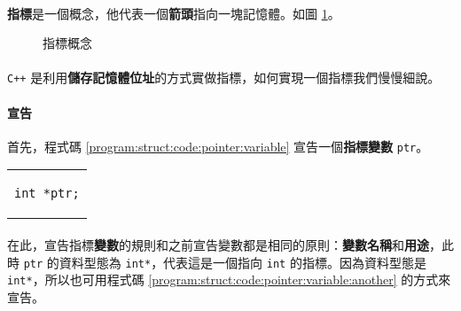 \documentclass[12pt,a4paper,oneside]{article}
\begin{document}
\begin{CJK}{UTF8}{bkai}
\paragraph{}\textbf{指標}是一個概念，他代表一個{\color{blue}\textbf{箭頭}}指向一塊記憶體。如圖 \ref{program:struct:fig:pointer}。

\begin{figure}[h!]
\centering
{}
\caption{指標概念}
\label{program:struct:fig:pointer}
\end{figure}

\paragraph{}\texttt{C++} 是利用{\color{red}\textbf{儲存記憶體位址}}的方式實做指標，如何實現一個指標我們慢慢細說。
\paragraph{宣告}首先，程式碼 \ref{program:struct:code:pointer:variable} 宣告一個\textbf{指標變數} \lstinline!ptr!。

\begin{code}[h!]
\centering
\begin{tabular}{c}
\begin{lstlisting}
int *ptr;
\end{lstlisting}
\end{tabular}
\caption{宣告指標變數 \lstinline!ptr!}
\label{program:struct:code:pointer:variable}
\end{code}

\paragraph{}在此，宣告指標\textbf{變數}的規則和之前宣告變數都是相同的原則：\textbf{變數名稱}和\textbf{用途}，此時 \lstinline!ptr! 的資料型態為 \lstinline!int*!，代表這是一個指向 \lstinline!int! 的指標。因為資料型態是 \lstinline!int*!，所以也可用程式碼 \ref{program:struct:code:pointer:variable:another} 的方式來宣告。


\end{CJK}
\end{document}

